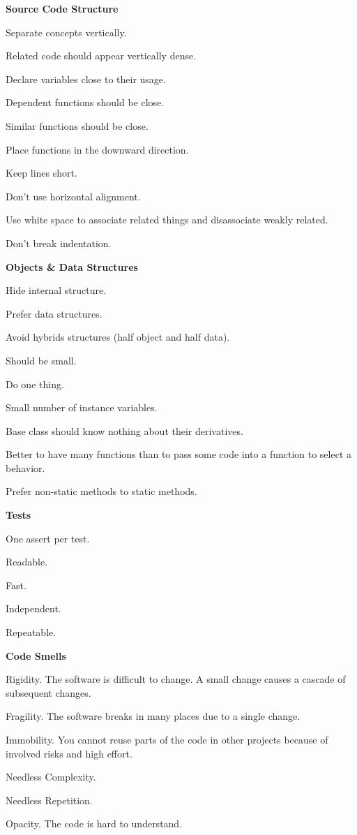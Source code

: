 \item \textbf{Source Code Structure}
\bit
\item Separate concepts vertically.
\item Related code should appear vertically dense.
\item Declare variables close to their usage.
\item Dependent functions should be close.
\item Similar functions should be close.
\item Place functions in the downward direction.
\item Keep lines short.
\item Don't use horizontal alignment.
\item Use white space to associate related things and disassociate weakly related.
\item Don't break indentation.
\eit

\item \textbf{Objects \& Data Structures}
\bit
\item Hide internal structure.
\item Prefer data structures.
\item Avoid hybrids structures (half object and half data).
\item Should be small.
\item Do one thing.
\item Small number of instance variables.
\item Base class should know nothing about their derivatives.
\item Better to have many functions than to pass some code into a function to select a behavior.
\item Prefer non-static methods to static methods.
\eit

\item \textbf{Tests}
\bit
\item One assert per test.
\item Readable.
\item Fast.
\item Independent.
\item Repeatable.
\eit

\item \textbf{Code Smells}
\bit
\item Rigidity. The software is difficult to change. A small change causes a cascade of subsequent changes.
\item Fragility. The software breaks in many places due to a single change.
\item Immobility. You cannot reuse parts of the code in other projects because of involved risks and high effort.
\item Needless Complexity.
\item Needless Repetition.
\item Opacity. The code is hard to understand.
\eit
\een

